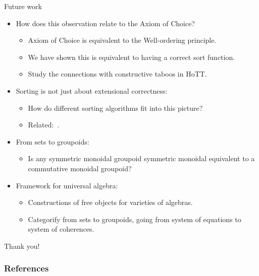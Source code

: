 \documentclass[9pt]{beamer}
\begin{document}
\begin{frame}{Future work}

\begin{itemize}
  \item How does this observation relate to the Axiom of Choice?
    \begin{itemize}
      \item Axiom of Choice is equivalent to the Well-ordering principle. %
        \item We have shown this is equivalent to having a correct sort function.
        \item Study the connections with constructive taboos in HoTT.
    \end{itemize}
    \item Sorting is not just about extensional correctness:
    \begin{itemize}
        \item How do different sorting algorithms fit into this picture?
        \item Related:~\cite{hinzeSortingBialgebrasDistributive2012}.
    \end{itemize}    
    \item From sets to groupoids:
    \begin{itemize}
        \item Is any symmetric monoidal groupoid symmetric monoidal equivalent to a commutative monoidal groupoid?
    \end{itemize}
    \item Framework for universal algebra:
    \begin{itemize}
        \item Constructions of free objects for varieties of algebras.
        \item Categorify from sets to groupoids, going from system of equations to system of coherences.
    \end{itemize}
\end{itemize}

\end{frame}

\begin{frame}[standout]
    Thank you!
\end{frame}


\begin{frame}[allowframebreaks]
    \frametitle{References}
    \printbibliography[heading=none]
\end{frame}
\end{document}
